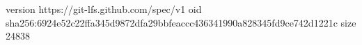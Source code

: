version https://git-lfs.github.com/spec/v1
oid sha256:6924e52c22ffa345d9872dfa29bbfeaccc436341990a828345fd9ce742d1221c
size 24838
